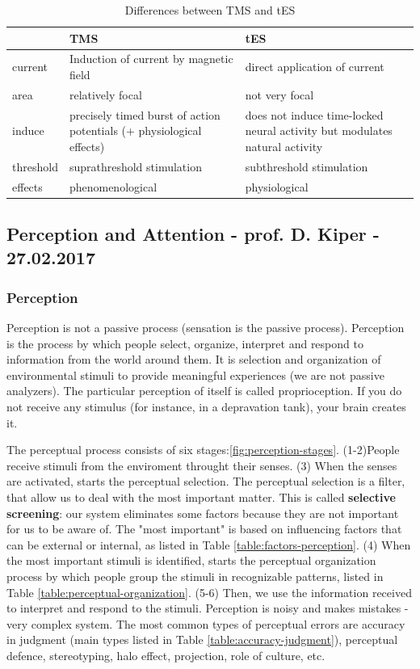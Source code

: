 \documentclass[12pt,article,oneside,a4paper]{memoir}
\begin{document}
\begin{table}[h]
  \begin{tabular}{ l |  p{6cm} |  p{6cm} }
    \hline
     & TMS & tES \\ \hline
    current & Induction of current by magnetic field & direct application of current \\ \hline
    area & relatively focal & not very focal \\ \hline
    induce & precisely timed burst of action potentials (+ physiological effects) & does not induce time-locked neural activity but modulates natural activity \\ \hline
	threshold & suprathreshold stimulation & subthreshold stimulation \\ \hline
    effects & phenomenological & physiological \\
    \hline
  \end{tabular}
  \caption{Differences between TMS and tES}
\end{table}


\subsection{Perception and Attention - prof. D. Kiper - 27.02.2017}

\subsubsection{Perception}
Perception is not a passive process (sensation is the passive process). Perception is the process by which people select, organize, interpret and respond to information from the world around them. It is selection and organization of environmental stimuli to provide meaningful experiences (we are not passive analyzers). The particular perception of itself is called proprioception. If you do not receive any stimulus (for instance, in a depravation tank), your brain creates it.

The perceptual process consists of six stages:\ref{fig:perception-stages}.
(1-2)People receive stimuli from the enviroment throught their senses.
(3) When the senses are activated, starts the perceptual selection. The perceptual selection is a filter, that allow us to deal with the most important matter. This is called \textbf{selective screening}: our system eliminates some factors because they are not important for us to be aware of. The "most important" is based on influencing factors that can be external or internal, as listed in Table \ref{table:factors-perception}.
(4) When the most important stimuli is identified, starts the perceptual organization process by which people group the stimuli in recognizable patterns, listed in Table  \ref{table:perceptual-organization}.
(5-6) Then, we use the information received to interpret and respond to the stimuli. Perception is noisy and makes mistakes - very complex system. The most common types of perceptual errors are accuracy in judgment (main types listed in Table \ref{table:accuracy-judgment}), perceptual defence, stereotyping, halo effect, projection, role of culture, etc.
\end{document}
